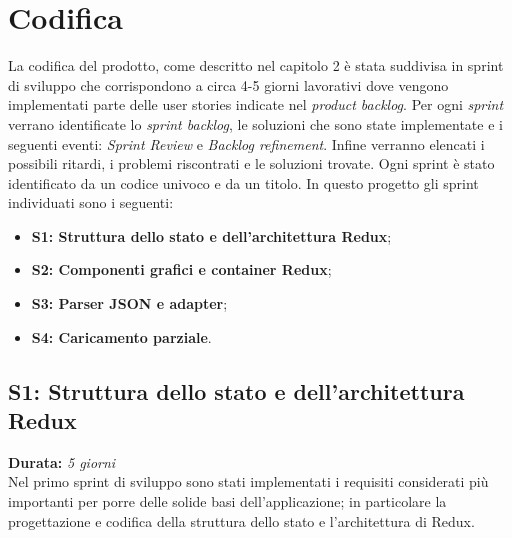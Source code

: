 
\chapter{Codifica}
\label{cap:codifica}

La codifica del prodotto, come descritto nel capitolo 2 è stata suddivisa in sprint di sviluppo che corrispondono a circa 4-5 giorni lavorativi dove vengono implementati parte delle user stories indicate nel \emph{product backlog}. Per ogni \emph{sprint} verrano identificate lo \emph{sprint backlog}, le soluzioni che sono state implementate e i seguenti eventi: \emph{Sprint Review} e \emph{Backlog refinement}.
Infine verranno elencati i possibili ritardi, i problemi riscontrati e le soluzioni trovate. Ogni sprint è stato identificato da un codice univoco e da un titolo. In questo progetto gli sprint individuati sono i seguenti:
\begin{itemize}
	\item \textbf{S1: Struttura dello stato e dell'architettura Redux};
	\item \textbf{S2: Componenti grafici e container Redux};
	\item \textbf{S3: Parser JSON e adapter};
	\item \textbf{S4: Caricamento parziale}.
\end{itemize}

\section{S1: Struttura dello stato e dell'architettura Redux}
\textbf{Durata:} \textit{5 giorni} \\
Nel primo sprint di sviluppo sono stati implementati i requisiti considerati più importanti per porre delle solide basi dell'applicazione; in particolare la progettazione e codifica della struttura dello stato e l'architettura di Redux.

